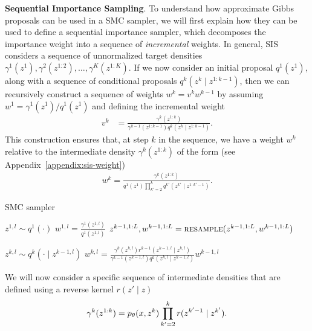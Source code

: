 \documentclass{article}
\theoremstyle{definition}
\begin{document}
\textbf{Sequential Importance Sampling}. To understand how approximate Gibbs proposals can be used in a SMC sampler, we will first explain how they can be used to define a sequential importance sampler, which decomposes the importance weight into a sequence of \emph{incremental} weights. In general, SIS considers a sequence of unnormalized target densities $\gamma^1(z^1), \gamma^2(z^{1:2}), \dots, \gamma^K(z^{1:K})$. If we now consider an initial proposal $q^1(z^1)$, along with a sequence of conditional proposals $q^k(z^k \mid z^{1:k-1})$, then we can recursively construct a sequence of weights $w^k = v^k w^{k-1}$ by assuming $w^1 = \gamma^1(z^1) / q^1(z^1)$ and defining the incremental weight
\begin{align*}
    v^k 
    &=
    \frac{\gamma^k(z^{1:k})}{\gamma^{k-1}(z^{1:k-1}) q^k(z^k \mid z^{1:k-1})}.
\end{align*}
This construction ensures that, at step $k$ in the sequence, we have a weight $w^k$ relative to the intermediate  density $\gamma^k(z^{1:k})$ of the form (see Appendix~\ref{appendix:sis-weight})
\begin{align*}
    w^k
    = 
    \frac{\gamma^k(z^{1:k})}
         {q^1(z^1) \prod_{k'=2}^k q^{k'}(z^{k'} \mid z^{1:k'-1})}.
\end{align*}
\begin{algorithm}[!t]
  \caption{SMC sampler}
  \label{alg:smcs}
\begin{algorithmic}[1]
    \small
        \State $z^{1,l} \sim q^1(\cdot)$
        \State $w^{1,l} = \frac{\gamma^1(z^{1,l})}{q^1(z^{1,l})}$
    \EndFor
      \State$z^{k-1,1:L}, w^{k-1,1:L}=\textsc{resample}(z^{k-1,1:L}, w^{k-1,1:L})$

          \State $z^{k,l} \sim q^k(\cdot \mid z^{k-1,l})$\label{line:apg-propose}
          \State $w^{k,l} = \frac{\gamma^k(z^{k,l}) r^{k-1}(z^{k-1,l} \mid z^{k,l})}{\gamma^{k-1}(z^{k-1,l}) q^k(z^{k,l} \mid z^{k-1,l})}w^{k-1,l}$
      \EndFor
    \EndFor
\end{algorithmic}
\end{algorithm}
We will now consider a specific sequence of intermediate densities that are defined using a reverse kernel $r(z' \mid z)$
\begin{align*}
    \gamma^k(z^{1:k})
    =
    p_\theta(x,z^k) \prod_{k'=2}^{k} r(z^{k'-1} \mid z^{k'})
    .
\end{align*}
\end{document}
